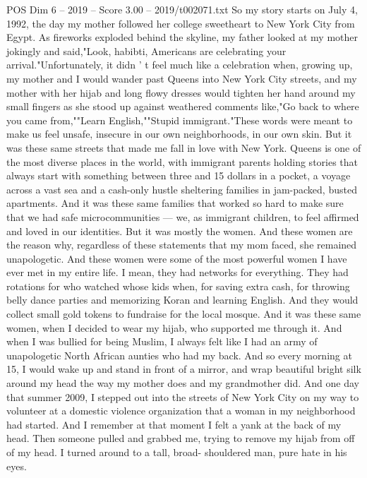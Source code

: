 \begin{textsample}{POS Dim 6 – 2019 – Score 3.00 – 2019/t002071.txt}  \label{ex:f6_pos_066}
So my story starts on July 4, 1992, the day my mother followed her college sweetheart to New York City from Egypt.
As fireworks exploded behind the skyline, my father looked at my mother jokingly and said,"Look, habibti, Americans are celebrating your arrival."Unfortunately, it didn ' t feel much like a celebration when, growing up, my mother and I would wander past Queens into New York City streets, and my mother with her hijab and long flowy dresses would tighten her hand around my small fingers as she stood up against weathered comments like,"Go back to where you came from,""Learn English,""Stupid immigrant."These words were meant to make us feel unsafe, insecure in our own neighborhoods, in our own skin.
But it was these same streets that made me fall in love with New York.
Queens is one of the most diverse places in the world, with immigrant parents holding stories that always start with something between three and 15 dollars in a pocket, a voyage across a vast sea and a cash-only hustle sheltering families in jam-packed, busted apartments.
And it was these same families that worked so hard to make sure that we had safe microcommunities — we, as immigrant children, to feel affirmed and loved in our identities.
But it was mostly the women.
And these women are the reason why, regardless of these statements that my mom faced, she remained unapologetic.
And these women were some of the most powerful women I have ever met in my entire life.
I mean, they had networks for everything.
They had rotations for who watched whose kids when, for saving extra cash, for throwing belly dance parties and memorizing Koran and learning English.
And they would collect small gold tokens to fundraise for the local mosque.
And it was these same women, when I decided to wear my hijab, who supported me through it.
And when I was bullied for being Muslim, I always felt like I had an army of unapologetic North African aunties who had my back.
And so every morning at 15, I would wake up and stand in front of a mirror, and wrap beautiful bright silk around my head the way my mother does and my grandmother did.
And one day that summer 2009, I stepped out into the streets of New York City on my way to volunteer at a domestic violence organization that a woman in my neighborhood had started.
And I remember at that moment I felt a yank at the back of my head.
Then someone pulled and grabbed me, trying to remove my hijab from off of my head.
I turned around to a tall, broad- shouldered man, pure hate in his eyes.

\end{textsample}
